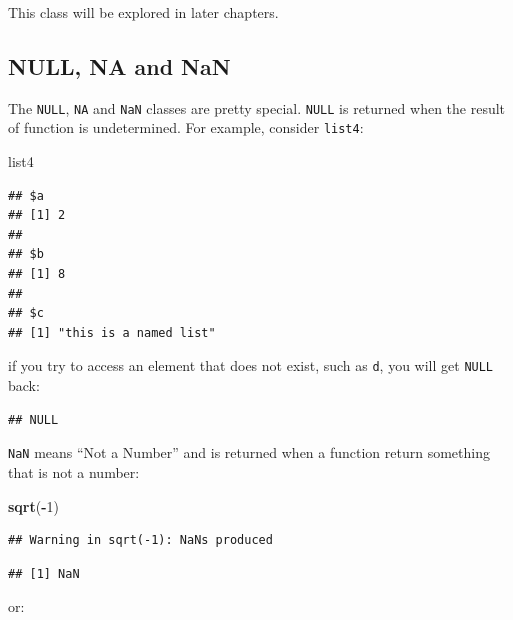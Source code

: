 \documentclass[]{gitbook}
\newenvironment{Shaded}{\begin{snugshade}}{\end{snugshade}}
\newcommand{\DecValTok}[1]{\textcolor[rgb]{0.00,0.00,0.81}{#1}}
\newcommand{\KeywordTok}[1]{\textcolor[rgb]{0.13,0.29,0.53}{\textbf{#1}}}
\newcommand{\NormalTok}[1]{#1}
\newcommand{\OperatorTok}[1]{\textcolor[rgb]{0.81,0.36,0.00}{\textbf{#1}}}
\begin{document}
This class will be explored in later chapters.

\hypertarget{null-na-and-nan}{%
\subsection{NULL, NA and NaN}\label{null-na-and-nan}}

The \texttt{NULL}, \texttt{NA} and \texttt{NaN} classes are pretty special. \texttt{NULL} is returned when the result of function is undetermined.
For example, consider \texttt{list4}:

\begin{Shaded}
\begin{Highlighting}[]
\NormalTok{list4}
\end{Highlighting}
\end{Shaded}

\begin{verbatim}
## $a
## [1] 2
## 
## $b
## [1] 8
## 
## $c
## [1] "this is a named list"
\end{verbatim}

if you try to access an element that does not exist, such as \texttt{d}, you will get \texttt{NULL} back:

\begin{Shaded}
\end{Shaded}

\begin{verbatim}
## NULL
\end{verbatim}

\texttt{NaN} means ``Not a Number'' and is returned when a function return something that is not a number:

\begin{Shaded}
\begin{Highlighting}[]
\KeywordTok{sqrt}\NormalTok{(}\OperatorTok{-}\DecValTok{1}\NormalTok{)}
\end{Highlighting}
\end{Shaded}

\begin{verbatim}
## Warning in sqrt(-1): NaNs produced
\end{verbatim}

\begin{verbatim}
## [1] NaN
\end{verbatim}

or:
\end{document}
